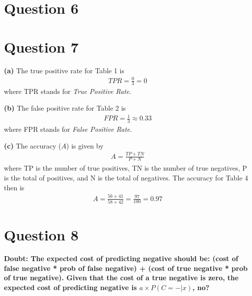 \documentclass[leqno]{article}
\begin{document}
\section*{Question 6}

\hfill

\section*{Question 7} \textbf{(a)} The true positive rate for Table 1 is
\begin{equation*}
\begin{split}
TPR = \frac{0}{3} = 0
\end{split}
\end{equation*} 
where TPR stands for \textit{True Positive Rate}.

\hfill

\noindent \textbf{(b)} The false positive rate for Table 2 is
\begin{equation*}
\begin{split}
FPR = \frac{1}{3} \approx 0.33
\end{split}
\end{equation*} 
where FPR stands for \textit{False Positive Rate}.

\hfill

\noindent \textbf{(c)} The accuracy ($A$) is given by
\begin{equation*}
\begin{split}
A = \frac{TP + TN}{P + N}
\end{split}
\end{equation*} 
where TP is the number of true positives, TN is the number of true negatives, P is the total of positives, and N is 
the total of negatives. The accuracy for Table 4 then is
\begin{equation*}
\begin{split}
A = \frac{56 + 41}{58 + 42} = \frac{97}{100} = 0.97 
\end{split}
\end{equation*} 

\section*{Question 8} \textbf{Doubt: The expected cost of predicting negative should be: (cost of false negative * prob of false negative) + 
 (cost of true negative * prob of true negative). Given that the cost of a true negative is zero, the expected cost of predicting negative is $a \times P(C = - | x)$, no? }
\end{document}
